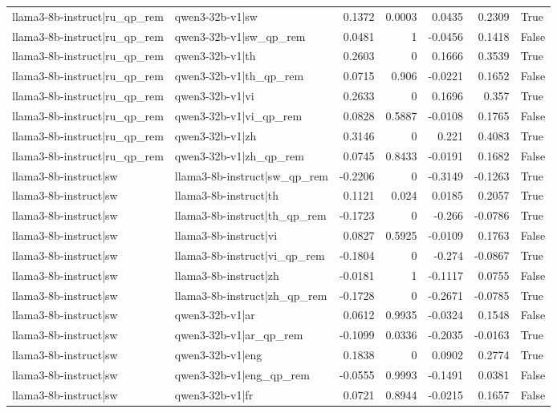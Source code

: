 \begin{table}
\begin{tabular}{l l r r r r l}
llama3-8b-instruct|ru_qp_rem & qwen3-32b-v1|sw & 0.1372 & 0.0003 & 0.0435 & 0.2309 & True \\
llama3-8b-instruct|ru_qp_rem & qwen3-32b-v1|sw_qp_rem & 0.0481 & 1 & -0.0456 & 0.1418 & False \\
llama3-8b-instruct|ru_qp_rem & qwen3-32b-v1|th & 0.2603 & 0 & 0.1666 & 0.3539 & True \\
llama3-8b-instruct|ru_qp_rem & qwen3-32b-v1|th_qp_rem & 0.0715 & 0.906 & -0.0221 & 0.1652 & False \\
llama3-8b-instruct|ru_qp_rem & qwen3-32b-v1|vi & 0.2633 & 0 & 0.1696 & 0.357 & True \\
llama3-8b-instruct|ru_qp_rem & qwen3-32b-v1|vi_qp_rem & 0.0828 & 0.5887 & -0.0108 & 0.1765 & False \\
llama3-8b-instruct|ru_qp_rem & qwen3-32b-v1|zh & 0.3146 & 0 & 0.221 & 0.4083 & True \\
llama3-8b-instruct|ru_qp_rem & qwen3-32b-v1|zh_qp_rem & 0.0745 & 0.8433 & -0.0191 & 0.1682 & False \\
llama3-8b-instruct|sw & llama3-8b-instruct|sw_qp_rem & -0.2206 & 0 & -0.3149 & -0.1263 & True \\
llama3-8b-instruct|sw & llama3-8b-instruct|th & 0.1121 & 0.024 & 0.0185 & 0.2057 & True \\
llama3-8b-instruct|sw & llama3-8b-instruct|th_qp_rem & -0.1723 & 0 & -0.266 & -0.0786 & True \\
llama3-8b-instruct|sw & llama3-8b-instruct|vi & 0.0827 & 0.5925 & -0.0109 & 0.1763 & False \\
llama3-8b-instruct|sw & llama3-8b-instruct|vi_qp_rem & -0.1804 & 0 & -0.274 & -0.0867 & True \\
llama3-8b-instruct|sw & llama3-8b-instruct|zh & -0.0181 & 1 & -0.1117 & 0.0755 & False \\
llama3-8b-instruct|sw & llama3-8b-instruct|zh_qp_rem & -0.1728 & 0 & -0.2671 & -0.0785 & True \\
llama3-8b-instruct|sw & qwen3-32b-v1|ar & 0.0612 & 0.9935 & -0.0324 & 0.1548 & False \\
llama3-8b-instruct|sw & qwen3-32b-v1|ar_qp_rem & -0.1099 & 0.0336 & -0.2035 & -0.0163 & True \\
llama3-8b-instruct|sw & qwen3-32b-v1|eng & 0.1838 & 0 & 0.0902 & 0.2774 & True \\
llama3-8b-instruct|sw & qwen3-32b-v1|eng_qp_rem & -0.0555 & 0.9993 & -0.1491 & 0.0381 & False \\
llama3-8b-instruct|sw & qwen3-32b-v1|fr & 0.0721 & 0.8944 & -0.0215 & 0.1657 & False \\

\end{tabular}
\end{table}
